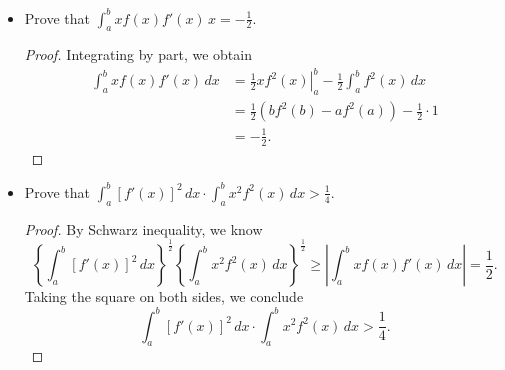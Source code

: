 \begin{Exercise}
	\begin{itemize}
		\item Prove that $\int_{a}^{b}x f(x) f'(x)\,x = -\frac{1}{2}$.
		\begin{proof}
			Integrating by part, we obtain
			\begin{align*}
			\int_{a}^{b} x f(x) f'(x)\,dx
			&= \left. \frac{1}{2}x f^2(x) \right|_{a}^{b} - \frac{1}{2} \int_{a}^{b} f^2(x)\,dx \\
			&=\frac{1}{2}\left( b f^2(b) - a f^2(a) \right) - \frac{1}{2}\cdot 1 \\
			&= -\frac{1}{2}.
			\end{align*}
		\end{proof}
		
		\item Prove that $\int_{a}^{b}[f'(x)]^2\,dx\cdot \int_{a}^{b}x^2 f^2(x)\,dx > \frac{1}{4}$.
		\begin{proof}
			By Schwarz inequality, we know
			$$
			\left\{ \int_{a}^{b} [f'(x)]^2\,dx \right\}^{\frac{1}{2}} \left\{ \int_{a}^{b} x^2 f^2(x)\,dx \right\}^{\frac{1}{2}}
			\geq \left| \int_{a}^{b} x f(x) f'(x)\,dx \right|
			= \frac{1}{2}.
			$$
			Taking the square on both sides, we conclude
			$$
			\int_{a}^{b} [f'(x)]^2\,dx \cdot \int_{a}^{b} x^2 f^2(x)\,dx > \frac{1}{4}.
			$$ 
		\end{proof}
	\end{itemize}
\end{Exercise}